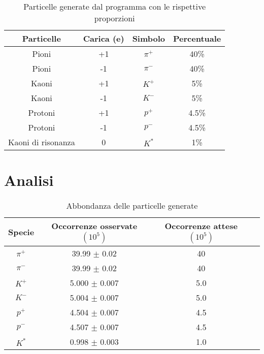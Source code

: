 \documentclass[a4paper,10pt,twocolumn]{article}
\begin{document}
\begin{table*}
    \caption{Particelle generate dal programma con le rispettive proporzioni}
    \label{tab:proporzioni}
    \centering
    \begin{tabular}{cccc}
        \toprule
        Particelle         & Carica (e) & Simbolo & Percentuale \\
        \midrule
        Pioni              & +1         & $\pi^+$ & 40\%        \\
        Pioni              & -1         & $\pi^-$ & 40\%        \\
        Kaoni              & +1         & $K^+$   & 5\%         \\
        Kaoni              & -1         & $K^-$   & 5\%         \\
        Protoni            & +1         & $p^+$   & 4.5\%       \\
        Protoni            & -1         & $p^-$   & 4.5\%       \\
        Kaoni di risonanza & 0          & $K^*$   & 1\%         \\
        \bottomrule
    \end{tabular}
\end{table*}

\section{Analisi}

\begin{table*}
    \caption{Abbondanza delle particelle generate}
    \label{tab:abbondanza}
    \centering
    \begin{tabular}{cccc}
        \toprule
        Specie  & Occorrenze osservate $(10^5)$ & Occorrenze attese $(10^5)$ \\
        \midrule
        $\pi^+$ & 39.99 $\pm$ 0.02              & 40                         \\
        $\pi^-$ & 39.99 $\pm$ 0.02              & 40                         \\
        $K^+$   & 5.000 $\pm$ 0.007             & 5.0                        \\
        $K^-$   & 5.004 $\pm$ 0.007             & 5.0                        \\
        $p^+$   & 4.504 $\pm$ 0.007             & 4.5                        \\
        $p^-$   & 4.507 $\pm$ 0.007             & 4.5                        \\
        $K^*$   & 0.998 $\pm$ 0.003             & 1.0                        \\
        \bottomrule
    \end{tabular}
\end{table*}
\end{document}
